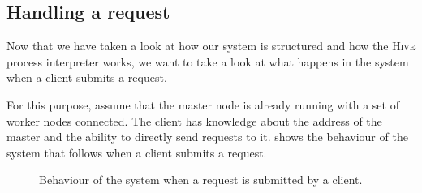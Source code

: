 \subsection{Handling a request}
Now that we have taken a look at how our system is structured and how the \textsc{Hive} process interpreter works, we want to take a look at what happens in the system when a client submits a request.

For this purpose, assume that the master node is already running with a set of worker nodes connected. The client has knowledge about the address of the master and the ability to directly send requests to it.  shows the behaviour of the system that follows when a client submits a request.

\begin{figure}[h!]
  \centering
  
  \caption{Behaviour of the system when a request is submitted by a client.}
  \label{fig:request_handling}
\end{figure}

